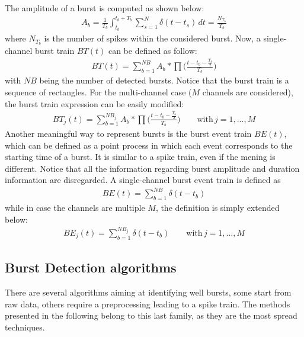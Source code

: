 The amplitude of a burst is computed as shown below:
\begin{align*}
    A_b=\frac{1}{T_b}\int_{t_b}^{t_b+T_b}\sum_{s=1}^{N}\delta{(t-t_s)}\,dt=\frac{N_{T_b}}{T_b}
\end{align*}
where \(N_{T_b}\) is the number of spikes within the considered burst.
Now, a single-channel burst train \(BT(t)\) can be defined as follow:
\begin{align*}
    BT(t) = \sum_{b=1}^{NB}A_b*\prod\biggl(\frac{t-t_b-\frac{T_b}{2}}{T_b}\biggr)
\end{align*}
with \(NB\) being the number of detected bursts. Notice that the burst train is a sequence
of rectangles. For the multi-channel case (\(M\) channels are considered), the burst train
expression can be easily modified:
\begin{align*}
    BT_{j}(t) = \sum_{b=1}^{NB_{j}}A_b*\prod\biggl(\frac{t-t_b-\frac{T_b}{2}}{T_b}\biggr)
    \quad\quad\text{with}\,j=1,...,M
\end{align*}
Another meaningful way to represent bursts is the burst event train \(BE(t)\), which can
be defined as a point process in which each event corresponds to the starting time of a
burst. It is similar to a spike train, even if the mening is different. Notice that
all the information regarding burst amplitude and duration information are disregarded.
A single-channel burst event train is defined as
\begin{align*}
    BE(t)=\sum_{b=1}^{NB}\delta(t-t_b)
\end{align*}
while in case the channels are multiple \(M\), the definition is simply extended below:
\begin{align*}
    BE_{j}(t)=\sum_{b=1}^{NB_{j}}\delta(t-t_b)
    \quad\quad\text{with}\,j=1,...,M
\end{align*}


\subsection{Burst Detection algorithms}
There are several algorithms aiming at identifying well bursts, some start from raw data,
others require a preprocessing leading to a spike train. The methods presented in the
following belong to this last family, as they are the most spread techniques.

